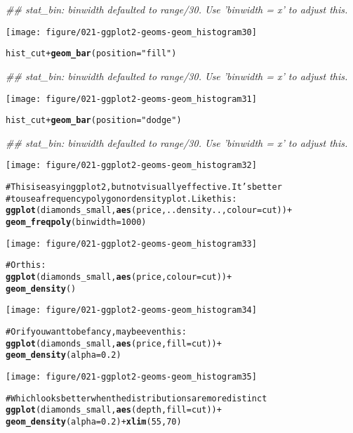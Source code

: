 \documentclass[a4paper,titlepage]{tufte-handout}\usepackage{graphicx, color}
\makeatletter
\def\maxwidth{ %
  \ifdim\Gin@nat@width>\linewidth
    \linewidth
  \else
    \Gin@nat@width
  \fi
}
\newcommand{\hlfunctioncall}[1]{\textcolor[rgb]{0.501960784313725,0,0.329411764705882}{\textbf{#1}}}%
\newcommand{\hlstring}[1]{\textcolor[rgb]{0.6,0.6,1}{#1}}%
\newcommand{\hlcomment}[1]{\textcolor[rgb]{0.180392156862745,0.6,0.341176470588235}{#1}}%
\newenvironment{kframe}{%
 \def\at@end@of@kframe{}%
 \ifinner\ifhmode%
  \def\at@end@of@kframe{\end{minipage}}%
  \begin{minipage}{\columnwidth}%
 \fi\fi%
 \def\FrameCommand##1{\hskip\@totalleftmargin \hskip-\fboxsep
 \colorbox{shadecolor}{##1}\hskip-\fboxsep
     \hskip-\linewidth \hskip-\@totalleftmargin \hskip\columnwidth}%
 \MakeFramed {\advance\hsize-\width
   \@totalleftmargin\z@ \linewidth\hsize
   \@setminipage}}%
 {\par\unskip\endMakeFramed%
 \at@end@of@kframe}
\newenvironment{knitrout}{}{} %
\makeatother
\begin{document}
\begin{knitrout}
\begin{kframe}
{\ttfamily\noindent\itshape\textcolor{messagecolor}{\#\# stat\_bin: binwidth defaulted to range/30. Use 'binwidth = x' to adjust this.}}\end{kframe}\texttt{[image: figure/021-ggplot2-geoms-geom\_histogram30]} \begin{kframe}\begin{alltt}
hist_cut + \hlfunctioncall{geom_bar}(position=\hlstring{"fill"})
\end{alltt}


{\ttfamily\noindent\itshape\textcolor{messagecolor}{\#\# stat\_bin: binwidth defaulted to range/30. Use 'binwidth = x' to adjust this.}}\end{kframe}\texttt{[image: figure/021-ggplot2-geoms-geom\_histogram31]} \begin{kframe}\begin{alltt}
hist_cut + \hlfunctioncall{geom_bar}(position=\hlstring{"dodge"})
\end{alltt}


{\ttfamily\noindent\itshape\textcolor{messagecolor}{\#\# stat\_bin: binwidth defaulted to range/30. Use 'binwidth = x' to adjust this.}}\end{kframe}\texttt{[image: figure/021-ggplot2-geoms-geom\_histogram32]} \begin{kframe}\begin{alltt}
\hlcomment{# This is easy in ggplot2, but not visually effective.  It's better}
\hlcomment{# to use a frequency polygon or density plot.  Like this:}
\hlfunctioncall{ggplot}(diamonds_small, \hlfunctioncall{aes}(price, ..density.., colour = cut)) +
  \hlfunctioncall{geom_freqpoly}(binwidth = 1000)
\end{alltt}
\end{kframe}\texttt{[image: figure/021-ggplot2-geoms-geom\_histogram33]} \begin{kframe}\begin{alltt}
\hlcomment{# Or this:}
\hlfunctioncall{ggplot}(diamonds_small, \hlfunctioncall{aes}(price, colour = cut)) +
  \hlfunctioncall{geom_density}()
\end{alltt}
\end{kframe}\texttt{[image: figure/021-ggplot2-geoms-geom\_histogram34]} \begin{kframe}\begin{alltt}
\hlcomment{# Or if you want to be fancy, maybe even this:}
\hlfunctioncall{ggplot}(diamonds_small, \hlfunctioncall{aes}(price, fill = cut)) +
  \hlfunctioncall{geom_density}(alpha = 0.2)
\end{alltt}
\end{kframe}\texttt{[image: figure/021-ggplot2-geoms-geom\_histogram35]} \begin{kframe}\begin{alltt}
\hlcomment{# Which looks better when the distributions are more distinct}
\hlfunctioncall{ggplot}(diamonds_small, \hlfunctioncall{aes}(depth, fill = cut)) +
  \hlfunctioncall{geom_density}(alpha = 0.2) + \hlfunctioncall{xlim}(55, 70)
\end{alltt}



\end{kframe}
\end{knitrout}
\end{document}
